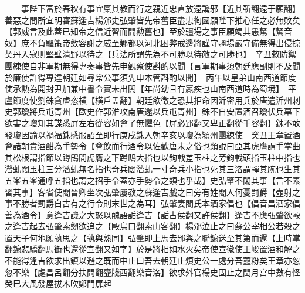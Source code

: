　　事陛下富於春秋有事宜稟其教而行之親近忠直放遠讒邪【近其靳翻遠于願翻】善惡之間所宜明審蘇逢吉楊邠史弘肇皆先帝舊臣盡忠徇國願陛下推心任之必無敗矣【郭威言及此蓋已知帝之信近習而間勲舊也】至於疆場之事臣願竭其愚駑【駑音奴】庶不負驅策帝斂容謝之威至鄴都以河北困弊戒邊將謹守疆場嚴守備無得出侵掠契丹入寇則堅壁清野以待之【兵法所謂先為不可勝以待敵之可勝也】　辛丑敕防禦團練使自非軍期無得專奏事皆先申觀察使斟酌以聞【言軍期事須朝廷應副則不及聞於廉使許得專達朝廷如尋常公事須先申本管斟酌以聞】　丙午以皇弟山南西道節度使承勲為開封尹加兼中書令實未出閤【年尚幼且有羸疾也山南西道時為蜀境】　平盧節度使劉銖貪虐恣横【横戶孟翻】朝廷欲徵之恐其拒命因沂密用兵於唐遣沂州刺史郭瓊將兵屯青州【歐史作郭淮攻南唐還以兵屯青州】銖不自安置酒召瓊伏兵幕下欲害之瓊知其謀悉屏左右從容如會了無懼色【屛必郢翻又卑正翻從千容翻】銖不敢發瓊因諭以禍福銖感服詔至即行庚戌銖入朝辛亥以瓊為潁州團練使　癸丑王章置酒會諸朝貴酒酣為手勢令【會飲而行酒令以佐歡唐末之俗也類說曰亞其虎膺謂手掌曲其松根謂指節以蹲䲭間虎膺之下蹲鴟大指也以鉤戟差玉柱之旁鉤戟頭指玉柱中指也濳虬闊玉柱三分潛虬無名指也奇兵闊濳虬一寸奇兵小指也死其三洛謂嚲其腕也生其五峯五峯通呼五指也謂之招手令蓋亦手勢令之類也乎哉】史弘肇不閑其事【言不素習其事】客省使閻晉卿坐次弘肇屢教之蘇逢吉戲之曰旁有姓閻人何憂罰爵【壺射之事不勝者罰爵自古有之行令則末世之為耳】弘肇妻閻氏本酒家倡也【倡音昌酒家倡善為酒令】意逢吉譏之大怒以醜語詬逢吉【詬古侯翻又許侯翻】逢吉不應弘肇欲毆之逢吉起去弘肇索劒欲追之【毆烏口翻索山客翻】楊邠泣止之曰蘇公宰相公若殺之置天子何地願孰思之【孰與熟同】弘肇即上馬去邠與之聯鑣送至其第而還【上時掌翻鑣悲驕翻馬衘也還從宣翻又如字】於是將相如水火矣帝使宣徽使王峻置酒和解之不能得逢吉欲求出鎮以避之既而中止曰吾去朝廷止煩史公一處分吾虀粉矣王章亦忽忽不樂【處昌呂翻分扶問翻韲牋西翻樂音洛】欲求外官楊史固止之閏月宫中數有怪癸巳大風發屋拔木吹鄭門扉起

